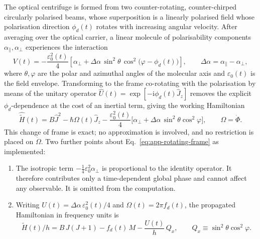 The optical centrifuge is formed from two counter-rotating, counter-chirped circularly polarised beams, whose superposition is a linearly polarised field
whose polarisation direction $\phi_d(t)$ rotates with increasing angular
velocity. After averaging over the optical carrier, a linear molecule of
polarisability components $\alpha_\parallel,\alpha_\perp$ experiences the
interaction
%
\begin{equation}
  V(t) = -\frac{\varepsilon_0^2(t)}{4}
         \left[\alpha_\perp
               + \Delta\alpha\,\sin^2\theta\,\cos^2\!\bigl(\varphi-\phi_d(t)\bigr)\right],
  \qquad \Delta\alpha = \alpha_\parallel-\alpha_\perp ,
  \label{eq:app-lab-interaction}
\end{equation}
%
where $\theta,\varphi$ are the polar and azimuthal angles of the molecular
axis and $\varepsilon_0(t)$ is the field envelope. Transforming to the frame
co-rotating with the polarisation by means of the unitary operator
$\hat U(t)=\exp[-\mathrm{i}\phi_d(t)\hat J_z]$ removes the explicit
$\phi_d$-dependence at the cost of an inertial term, giving the working
Hamiltonian
%
\begin{equation}
  \hat{\tilde H}(t)
  = B\hat J^{2}
    - \hbar\Omega(t)\hat J_{z}
    - \frac{\varepsilon_0^2(t)}{4}
      \bigl[\alpha_\perp + \Delta\alpha\,\sin^2\theta\cos^2\varphi\bigr],
  \qquad \Omega=\dot\Phi .
  \label{eq:app-rotating-frame}
\end{equation}
%
This change of frame is exact; no approximation is involved, and no
restriction is placed on $\dot\Omega$. Two further points about
Eq.~\eqref{eq:app-rotating-frame} as implemented:

\begin{enumerate}
  \item The isotropic term $-\tfrac{1}{4}\varepsilon_0^2\alpha_\perp$ is
        proportional to the identity operator. It therefore contributes only a
        time-dependent global phase and cannot affect any observable. It is
        omitted from the computation.
  \item Writing $U(t)=\Delta\alpha\,\varepsilon_0^2(t)/4$ and
        $\Omega(t)=2\pi f_d(t)$, the propagated Hamiltonian in frequency units
        is
        \begin{equation}
          \tilde H(t)/h = B\,J(J+1) - f_d(t)\,M - \frac{U(t)}{h}\,Q_x,
          \qquad Q_x \equiv \sin^2\theta\cos^2\varphi .
          \label{eq:app-working-hamiltonian}
        \end{equation}
\end{enumerate}

